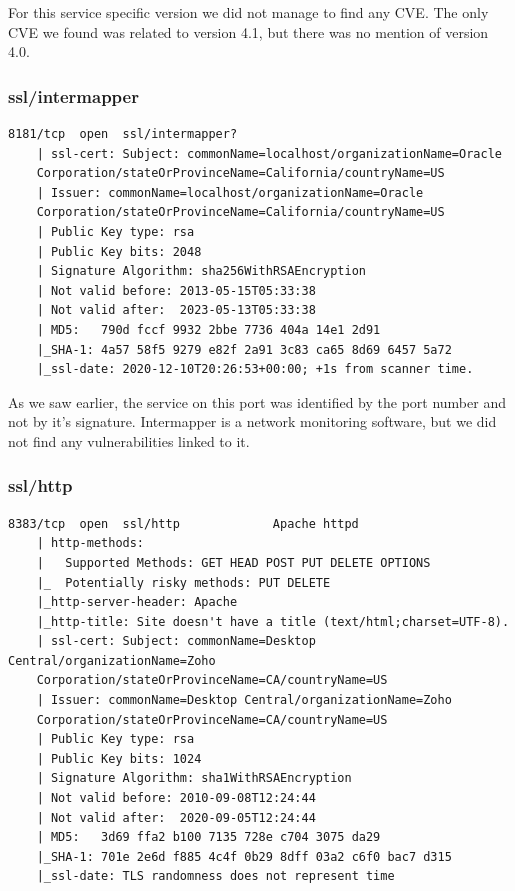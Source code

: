 For this service specific version we did not manage to find any CVE. The only CVE we found was related to version 4.1, but there was no mention of version 4.0.

\subsubsection{ssl/intermapper}

\begin{lstlisting}[basicstyle=\scriptsize]
    8181/tcp  open  ssl/intermapper?
    | ssl-cert: Subject: commonName=localhost/organizationName=Oracle 
    Corporation/stateOrProvinceName=California/countryName=US
    | Issuer: commonName=localhost/organizationName=Oracle 
    Corporation/stateOrProvinceName=California/countryName=US
    | Public Key type: rsa
    | Public Key bits: 2048
    | Signature Algorithm: sha256WithRSAEncryption
    | Not valid before: 2013-05-15T05:33:38
    | Not valid after:  2023-05-13T05:33:38
    | MD5:   790d fccf 9932 2bbe 7736 404a 14e1 2d91
    |_SHA-1: 4a57 58f5 9279 e82f 2a91 3c83 ca65 8d69 6457 5a72
    |_ssl-date: 2020-12-10T20:26:53+00:00; +1s from scanner time.
\end{lstlisting}

As we saw earlier, the service on this port was identified by the port number and not by it's signature. Intermapper is a network monitoring software, but we did not find any vulnerabilities linked to it.

\subsubsection{ssl/http}

\begin{lstlisting}[basicstyle=\scriptsize]
    8383/tcp  open  ssl/http             Apache httpd
    | http-methods: 
    |   Supported Methods: GET HEAD POST PUT DELETE OPTIONS
    |_  Potentially risky methods: PUT DELETE
    |_http-server-header: Apache
    |_http-title: Site doesn't have a title (text/html;charset=UTF-8).
    | ssl-cert: Subject: commonName=Desktop Central/organizationName=Zoho 
    Corporation/stateOrProvinceName=CA/countryName=US
    | Issuer: commonName=Desktop Central/organizationName=Zoho 
    Corporation/stateOrProvinceName=CA/countryName=US
    | Public Key type: rsa
    | Public Key bits: 1024
    | Signature Algorithm: sha1WithRSAEncryption
    | Not valid before: 2010-09-08T12:24:44
    | Not valid after:  2020-09-05T12:24:44
    | MD5:   3d69 ffa2 b100 7135 728e c704 3075 da29
    |_SHA-1: 701e 2e6d f885 4c4f 0b29 8dff 03a2 c6f0 bac7 d315
    |_ssl-date: TLS randomness does not represent time
\end{lstlisting}

